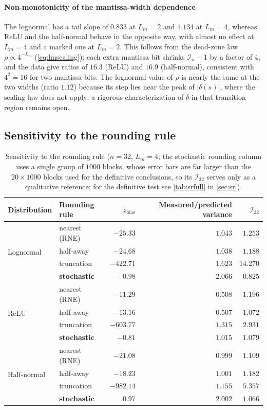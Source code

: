 \documentclass[review,hidelinks,oneeqnum,onetabnum,onefignum,onethmnum]{siamart251216}
\begin{document}
\paragraph{Non-monotonicity of the mantissa-width dependence} The lognormal has a
tail slope of $0.833$ at $L_m=2$ and $1.134$ at $L_m=4$, whereas ReLU and the
half-normal behave in the opposite way, with almost no effect at $L_m=4$ and a
marked one at $L_m=2$. This follows from the dead-zone law
$\rho\propto4^{-L_m}$ (\cref{eq:lmscaling}): each extra mantissa bit shrinks
$\mathcal I_n-1$ by a factor of $4$, and the data give ratios of $16.3$ (ReLU) and
$16.9$ (half-normal), consistent with $4^2=16$ for two mantissa bits. The
lognormal value of $\rho$ is nearly the same at the two widths (ratio $1.12$)
because its step lies near the peak of $|\delta(s)|$, where the scaling law does
not apply; a rigorous characterization of $\delta$ in that transition region
remains open.

\subsection{Sensitivity to the rounding rule}
\label{sec:modes}

\begin{table}[!tb]
\centering
\caption{Sensitivity to the rounding rule ($n=32$, $L_m=4$; the stochastic
rounding column uses a single group of $1000$ blocks, whose error bars are far
larger than the $20\times1000$ blocks used for the definitive conclusions, so its
$\mathcal I_{32}$ serves only as a qualitative reference; for the definitive test
see \cref{tab:srfull} in \cref{sec:sr}).}
\label{tab:modes}
\setlength{\tabcolsep}{4pt}
\small
\begin{tabular}{@{}llrrr@{}}
\toprule
Distribution & Rounding rule & $z_{\text{bias}}$ & Measured/predicted variance & $\mathcal I_{32}$ \\
\midrule
\multirow{4}{*}{Lognormal}
 & nearest (RNE) & $-25.33$ & $1.043$ & $1.253$ \\
 & half-away & $-24.68$ & $1.038$ & $1.188$ \\
 & truncation & $\mathbf{-422.71}$ & $1.623$ & $14.270$ \\
 & \textbf{stochastic} & $\mathbf{-0.98}$ & $2.066$ & $0.825$ \\
\midrule
\multirow{4}{*}{ReLU}
 & nearest (RNE) & $-11.29$ & $0.508$ & $1.196$ \\
 & half-away & $-13.16$ & $0.507$ & $1.072$ \\
 & truncation & $\mathbf{-603.77}$ & $1.315$ & $2.931$ \\
 & \textbf{stochastic} & $\mathbf{-0.81}$ & $1.015$ & $1.079$ \\
\midrule
\multirow{4}{*}{Half-normal}
 & nearest (RNE) & $-21.08$ & $0.999$ & $1.109$ \\
 & half-away & $-18.23$ & $1.001$ & $1.182$ \\
 & truncation & $\mathbf{-982.14}$ & $1.155$ & $5.357$ \\
 & \textbf{stochastic} & $\mathbf{0.97}$ & $2.002$ & $1.066$ \\
\bottomrule
\end{tabular}
\end{table}
\end{document}
